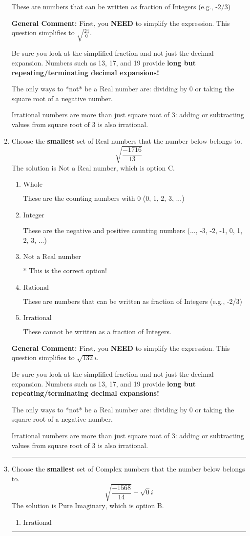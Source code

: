 \documentclass{extbook}[14pt]
\newcommand{\litem}[1]{\item #1

\rule{\textwidth}{0.4pt}}
\begin{document}
\begin{enumerate}
{\begin{enumerate}[label=\Alph*.]
These are numbers that can be written as fraction of Integers (e.g., -2/3)
\end{enumerate}

\textbf{General Comment:} First, you \textbf{NEED} to simplify the expression. This question simplifies to $\sqrt{\frac{24}{0}}$. 
 
 Be sure you look at the simplified fraction and not just the decimal expansion. Numbers such as 13, 17, and 19 provide \textbf{long but repeating/terminating decimal expansions!} 
 
 The only ways to *not* be a Real number are: dividing by 0 or taking the square root of a negative number. 
 
 Irrational numbers are more than just square root of 3: adding or subtracting values from square root of 3 is also irrational.
}
\litem{
Choose the \textbf{smallest} set of Real numbers that the number below belongs to.
\[ \sqrt{\frac{-1716}{13}} \]The solution is \( \text{Not a Real number} \), which is option C.\begin{enumerate}[label=\Alph*.]
\item \( \text{Whole} \)

These are the counting numbers with 0 (0, 1, 2, 3, ...)
\item \( \text{Integer} \)

These are the negative and positive counting numbers (..., -3, -2, -1, 0, 1, 2, 3, ...)
\item \( \text{Not a Real number} \)

* This is the correct option!
\item \( \text{Rational} \)

These are numbers that can be written as fraction of Integers (e.g., -2/3)
\item \( \text{Irrational} \)

These cannot be written as a fraction of Integers.
\end{enumerate}

\textbf{General Comment:} First, you \textbf{NEED} to simplify the expression. This question simplifies to $\sqrt{132} i$. 
 
 Be sure you look at the simplified fraction and not just the decimal expansion. Numbers such as 13, 17, and 19 provide \textbf{long but repeating/terminating decimal expansions!} 
 
 The only ways to *not* be a Real number are: dividing by 0 or taking the square root of a negative number. 
 
 Irrational numbers are more than just square root of 3: adding or subtracting values from square root of 3 is also irrational.
}
\litem{
Choose the \textbf{smallest} set of Complex numbers that the number below belongs to.
\[ \sqrt{\frac{-1568}{14}}+\sqrt{0}i \]The solution is \( \text{Pure Imaginary} \), which is option B.\begin{enumerate}[label=\Alph*.]
\item \( \text{Irrational} \)


\end{enumerate}}
\end{enumerate}
\end{document}

